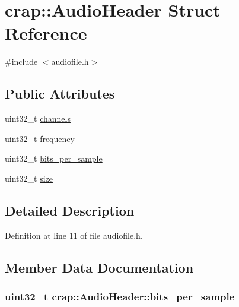 \hypertarget{structcrap_1_1_audio_header}{}\section{crap\+:\+:Audio\+Header Struct Reference}
\label{structcrap_1_1_audio_header}


{\ttfamily \#include $<$audiofile.\+h$>$}

\subsection*{Public Attributes}
\begin{DoxyCompactItemize}
\item 
uint32\+\_\+t \hyperlink{structcrap_1_1_audio_header_acce2baa85f0c4f92b05f0c7c5c831835}{channels}
\item 
uint32\+\_\+t \hyperlink{structcrap_1_1_audio_header_a4e84b055b61332538db96e156cc13fe6}{frequency}
\item 
uint32\+\_\+t \hyperlink{structcrap_1_1_audio_header_a73e84cbdf153067986b4826f48e7c6e9}{bits\+\_\+per\+\_\+sample}
\item 
uint32\+\_\+t \hyperlink{structcrap_1_1_audio_header_abb74cac78b291b8f8548566db8aa1112}{size}
\end{DoxyCompactItemize}


\subsection{Detailed Description}


Definition at line 11 of file audiofile.\+h.



\subsection{Member Data Documentation}
\hypertarget{structcrap_1_1_audio_header_a73e84cbdf153067986b4826f48e7c6e9}{}
\subsubsection[{bits\+\_\+per\+\_\+sample}]{\setlength{\rightskip}{0pt plus 5cm}uint32\+\_\+t crap\+::\+Audio\+Header\+::bits\+\_\+per\+\_\+sample}\label{structcrap_1_1_audio_header_a73e84cbdf153067986b4826f48e7c6e9}


